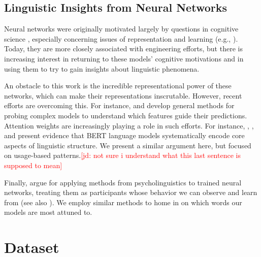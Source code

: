 \documentclass[11pt,a4paper]{article}
\newcommand{\jd}[1]{\textcolor{Red}{[jd: #1]}}
\begin{document}
\subsection{Linguistic Insights from Neural Networks}

Neural networks were originally motivated largely by questions in cognitive science \citep{pater2019generative}, especially concerning issues of representation and learning (e.g., \citealt{rumelhart1986learning,tesar2000learnability}). Today, they are more closely associated with engineering efforts, but there is increasing interest in returning to these models' cognitive motivations and in using them to try to gain insights about linguistic phenomena.

An obstacle to this work is the incredible representational power of these networks, which can make their representations inscrutable. However, recent efforts are overcoming this. For instance, \citet{N16-3020} and \citet{Koh:Liang:2017} develop general methods for probing complex models to understand which features  guide their predictions. Attention weights are increasingly playing a role in such efforts. For instance, \citet{jawahar-etal-2019-bert}, \citet{clark2019what}, and \citet{tenney-etal-2019-bert} present evidence that BERT language models systematically encode core aspects of linguistic structure. We present a similar argument here, but focused on usage-based patterns.\jd{not sure i understand what this last sentence is supposed to mean}

Finally, \citet{linzen-etal-2016-assessing} argue for applying methods from psycholinguistics to trained neural networks, treating them as participants whose behavior we can observe and learn from (see also \citealt{gulordava-etal-2018-colorless,Futrell-etal:2019}). We employ similar methods to home in on which words our models are most attuned to.


\section{Dataset}\label{sec:dataset}
\end{document}
